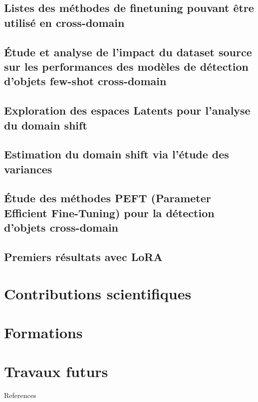 \documentclass[xcolor=table, 8pt]{beamer}
\begin{document}
    \subsection{Listes des méthodes de finetuning pouvant être utilisé en cross-domain}\label{subsec:fs-od-cd-sota}
    
    

    \subsection{Étude et analyse de l'impact du dataset source sur les performances des modèles de détection d'objets few-shot cross-domain}\label{subsec:srcdata}
    


    \subsection{Exploration des espaces Latents pour l'analyse du domain shift}\label{subsec:results-embeddings}
    
    
    \subsection{Estimation du domain shift via l'étude des variances}\label{subsec:results-variances}
    
    

    \subsection{Étude des méthodes PEFT (Parameter Efficient Fine-Tuning) pour la détection d'objets cross-domain}\label{sec:peft}
    
    

    \subsection{Premiers résultats avec LoRA}\label{subsec:results-loracurves}
    




    \section{Contributions scientifiques}\label{subsec:approach-publications}
    

    \section{Formations}\label{subsec:formations}
    

    \section{Travaux futurs}\label{subsec:approach-future-work}
    



    \begin{frame}[allowframebreaks=]{References}
        \printbibliography
    \end{frame}
\end{document}
